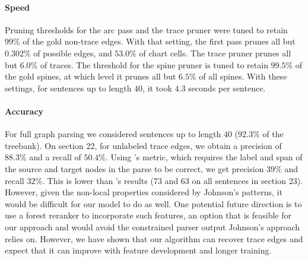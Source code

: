 \paragraph{Speed}
Pruning thresholds for the arc pass and the trace pruner were tuned to retain $99\%$ of the gold non-trace edges.
With that setting, the first pass prunes all but $0.302\%$ of possible edges, and $53.0\%$ of chart cells.
The trace pruner prunes all but $6.0\%$ of traces.
The threshold for the spine pruner is tuned to retain $99.5\%$ of the gold spines, at which level it prunes all but $6.5\%$ of all spines.
With these settings, for sentences up to length $40$, it took $4.3$ seconds per sentence.

\paragraph{Accuracy}
For full graph parsing we considered sentences up to length $40$ ($92.3\%$ of the treebank).
On section 22, for unlabeled trace edges, we obtain a precision of $88.3\%$ and a recall of $50.4\%$.
Using \textcite{Johnson:2002}'s metric, which requires the label and span of the source and target nodes in the parse to be correct, we get precision $39\%$ and recall $32\%$.
This is lower than \textcite{Johnson:2002}'s results ($73$ and $63$ on all sentences in section 23).
However, given the non-local properties considered by Johnson's patterns, it would be difficult for our model to do as well.
One potential future direction is to use a forest reranker to incorporate such features, an option that is feasible for our approach and would avoid the constrained parser output Johnson's approach relies on.
However, we have shown that our algorithm can recover trace edges and expect that it can improve with feature development and longer training.

